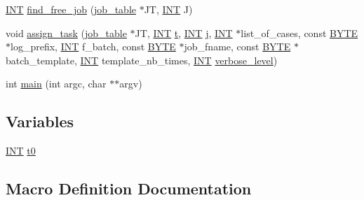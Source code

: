 \begin{DoxyCompactItemize}
\item 
\mbox{\hyperlink{galois_8h_a09fddde158a3a20bd2dcadb609de11dc}{I\+NT}} \mbox{\hyperlink{scheduler_8_c_a8a297557e06e79dff64e3345d704711b}{find\+\_\+free\+\_\+job}} (\mbox{\hyperlink{classjob__table}{job\+\_\+table}} $\ast$JT, \mbox{\hyperlink{galois_8h_a09fddde158a3a20bd2dcadb609de11dc}{I\+NT}} J)
\item 
void \mbox{\hyperlink{scheduler_8_c_a07c624f7125df1373130c0288d35b869}{assign\+\_\+task}} (\mbox{\hyperlink{classjob__table}{job\+\_\+table}} $\ast$JT, \mbox{\hyperlink{galois_8h_a09fddde158a3a20bd2dcadb609de11dc}{I\+NT}} \mbox{\hyperlink{alphabet2_8_c_ac310d9181e916ba43604099aee272c71}{t}}, \mbox{\hyperlink{galois_8h_a09fddde158a3a20bd2dcadb609de11dc}{I\+NT}} \mbox{\hyperlink{alphabet2_8_c_a37d972ae0b47b9099e30983131d31916}{j}}, \mbox{\hyperlink{galois_8h_a09fddde158a3a20bd2dcadb609de11dc}{I\+NT}} $\ast$list\+\_\+of\+\_\+cases, const \mbox{\hyperlink{galois_8h_ab6cc7b4aeb6ea31aba2b3fbfc83ff5e6}{B\+Y\+TE}} $\ast$log\+\_\+prefix, \mbox{\hyperlink{galois_8h_a09fddde158a3a20bd2dcadb609de11dc}{I\+NT}} f\+\_\+batch, const \mbox{\hyperlink{galois_8h_ab6cc7b4aeb6ea31aba2b3fbfc83ff5e6}{B\+Y\+TE}} $\ast$job\+\_\+fname, const \mbox{\hyperlink{galois_8h_ab6cc7b4aeb6ea31aba2b3fbfc83ff5e6}{B\+Y\+TE}} $\ast$batch\+\_\+template, \mbox{\hyperlink{galois_8h_a09fddde158a3a20bd2dcadb609de11dc}{I\+NT}} template\+\_\+nb\+\_\+times, \mbox{\hyperlink{galois_8h_a09fddde158a3a20bd2dcadb609de11dc}{I\+NT}} \mbox{\hyperlink{simeon_8_c_a818073fbcc2f439e7c56952f67386122}{verbose\+\_\+level}})
\item 
int \mbox{\hyperlink{scheduler_8_c_a3c04138a5bfe5d72780bb7e82a18e627}{main}} (int argc, char $\ast$$\ast$argv)
\end{DoxyCompactItemize}
\subsection*{Variables}
\begin{DoxyCompactItemize}
\item 
\mbox{\hyperlink{galois_8h_a09fddde158a3a20bd2dcadb609de11dc}{I\+NT}} \mbox{\hyperlink{scheduler_8_c_a4268f4fe222ffb119218a0199f5e1904}{t0}}
\end{DoxyCompactItemize}


\subsection{Macro Definition Documentation}
\mbox{\label{scheduler_8_c_a6079b3b36c54787d2dca2de2fb2c96df}} 
